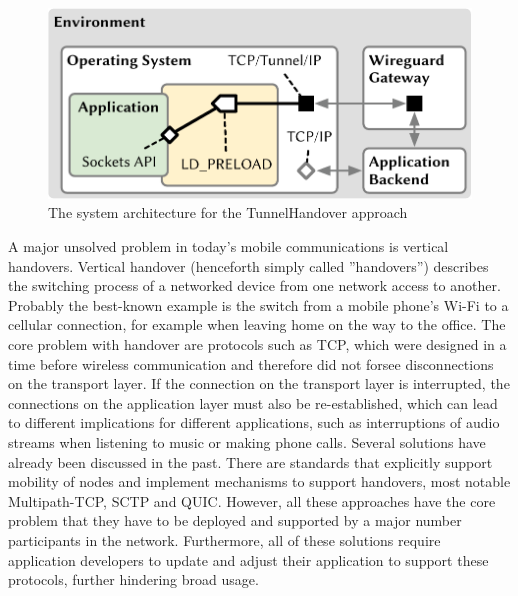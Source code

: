 \section{\wgh}
\label{sec:wg:impl}

\newcommand{\ld}{\texttt{LD\_PRELOAD}\xspace}

\begin{figure}
    \centering
    \includegraphics[width=.8\linewidth]{figures/model_TunnelHandover.pdf}
    \caption{The system architecture for the TunnelHandover approach}
    \label{fig:model_TunnelHandover}
\end{figure}

A major unsolved problem in today's mobile communications is vertical handovers.
Vertical handover (henceforth simply called ''handovers'') describes the switching process of a networked device from one network access to another.
Probably the best-known example is the switch from a mobile phone's Wi-Fi to a cellular connection, for example when leaving home on the way to the office.
The core problem with handover are protocols such as TCP, which were designed in a time before wireless communication and therefore did not forsee disconnections on the transport layer.
If the connection on the transport layer is interrupted, the connections on the application layer must also be re-established, which can lead to different implications for different applications, such as interruptions of audio streams when listening to music or making phone calls.
Several solutions have already been discussed in the past.
There are standards that explicitly support mobility of nodes and implement mechanisms to support handovers, most notable Multipath-TCP, SCTP and QUIC.
However, all these approaches have the core problem that they have to be deployed and supported by a major number participants in the network.
Furthermore, all of these solutions require application developers to update and adjust their application to support these protocols, further hindering broad usage.

